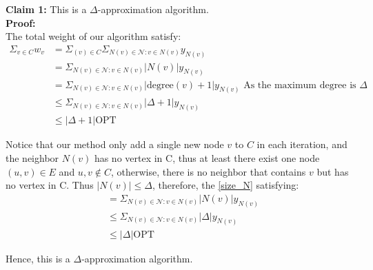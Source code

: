 \documentclass[a4paper,12pt]{article}
\def\N{{\mathcal{N}}}
\begin{document}
\noindent \textbf{Claim 1:} This is a $\Delta$-approximation algorithm.\\
 
\textbf{Proof:}\\
The total weight of our algorithm satisfy:
\begin{align}\label{cost}
\Sigma_{v \in C} w_{v} & =\Sigma_{(v) \in C} \Sigma_{N(v) \in \N: v \in N(v)} y_{N(v)}\\
& = \Sigma_{N(v) \in \N: v \in N(v)} |N(v)| y_{N(v)}\\ \label{size_N}
& = \Sigma_{N(v) \in \N: v \in N(v)} |\text{degree}(v) + 1| y_{N(v)}\text{  As the maximum degree is $\Delta$}\\
& \leq \Sigma_{N(v) \in \N: v \in N(v)} |\Delta + 1| y_{N(v)} \\
& \leq |\Delta + 1| \text{OPT}
\end{align}

Notice that our method only add a single new node $v$ to $C$ in each iteration, and the neighbor $N(v)$ has no vertex in C, thus at least there exist one node $(u,v) \in E$ and $u,v \notin C$, otherwise, there is no neighbor that contains $v$ but has no vertex in C. Thus $|N(v)|\leq \Delta$, therefore, the \eqref{size_N} satisfying:\\
\begin{align}\label{cost}
 & = \Sigma_{N(v) \in \N: v \in N(v)} |N(v)| y_{N(v)}\\  
 & \leq \Sigma_{N(v) \in \N: v \in N(v)} |\Delta  | y_{N(v)} \\
& \leq |\Delta  | \text{OPT}
\end{align}
 
Hence, this is a $\Delta$-approximation algorithm. 
\end{document}

